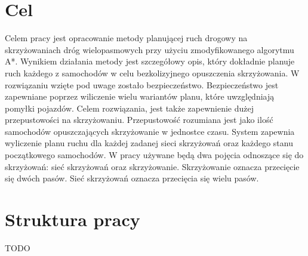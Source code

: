 \section{Cel}

Celem pracy jest opracowanie metody planującej ruch drogowy na skrzyżowaniach dróg wielopasmowych przy użyciu zmodyfikowanego algorytmu A*. Wynikiem działania metody jest szczegółowy opis, który dokładnie planuje ruch każdego z samochodów w celu bezkolizyjnego opuszczenia skrzyżowania. W rozwiązaniu wzięte pod uwage zostało bezpieczeństwo. Bezpieczeństwo jest zapewniane poprzez wiliczenie wielu wariantów planu, które uwzględniają pomyłki pojazdów. Celem rozwiązania, jest także zapewnienie dużej przepustowości na skrzyżowaniu. Przepustowość rozumiana jest jako ilość samochodów opuszczających skrzyżowanie w jednostce czasu. System zapewnia wyliczenie planu ruchu dla każdej zadanej sieci skrzyżowań oraz każdego stanu początkowego samochodów.
\newline
\indent
W pracy używane będą dwa pojęcia odnoszące się do skrzyżowań: sieć skrzyżowań oraz skrzyżowanie. Skrzyżowanie oznacza przecięcie się dwóch pasów. Sieć skrzyżowań oznacza przecięcia się wielu pasów.

\section{Struktura pracy}
TODO
